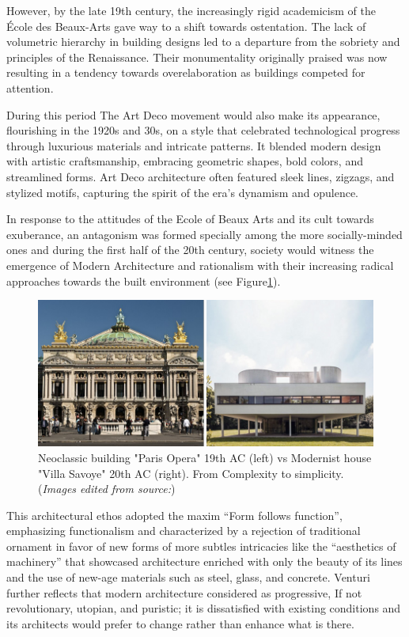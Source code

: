 However, by the late 19th century, the increasingly rigid academicism of the École des Beaux-Arts gave way to a shift towards ostentation.
The lack of volumetric hierarchy in building designs led to a departure from the sobriety and principles of the Renaissance.
Their monumentality originally praised was now resulting in a tendency towards overelaboration as buildings competed for attention\cite{Economakis2023}.

During this period The Art Deco movement would also make its appearance, flourishing in the 1920s and 30s, on a style that celebrated technological progress through luxurious materials and intricate patterns.
It blended modern design with artistic craftsmanship, embracing geometric shapes, bold colors, and streamlined forms.
Art Deco architecture often featured sleek lines, zigzags, and stylized motifs, capturing the spirit of the era's dynamism and opulence.\cite{Arora2023}

In response to the attitudes of the Ecole of Beaux Arts and its cult towards exuberance, an antagonism was formed specially among the more socially-minded ones and during the first half of the 20th century, society would witness the emergence of Modern Architecture and rationalism with their increasing radical approaches towards the built environment (see Figure\ref{fig:NeoclassicalvsModernism}).

     \begin{figure}[htb]
          \centering
          \includegraphics[width= \linewidth]{Images/NeoclassicismVsModernism}
          \caption{Neoclassic building "Paris Opera" 19th AC (left) vs Modernist house "Villa Savoye" 20th AC (right). From Complexity to simplicity. (\textit{Images edited from source:\cite{Stacbond2020}})}
          \label{fig:NeoclassicalvsModernism}
        \end{figure}

This architectural ethos adopted the maxim ``Form follows function'', emphasizing functionalism and characterized by a rejection of traditional ornament in favor of new forms of more subtles intricacies like the “aesthetics of machinery” that showcased architecture  enriched  with  only  the  beauty of its lines and the use of new-age materials such as steel, glass, and concrete\cite{Gage2015}.
Venturi\cite{Venturi1972} further reflects that modern architecture considered as progressive, If not revolutionary, utopian, and puristic;
it  is  dissatisfied  with existing conditions and its architects would prefer to change rather than enhance what is there.

